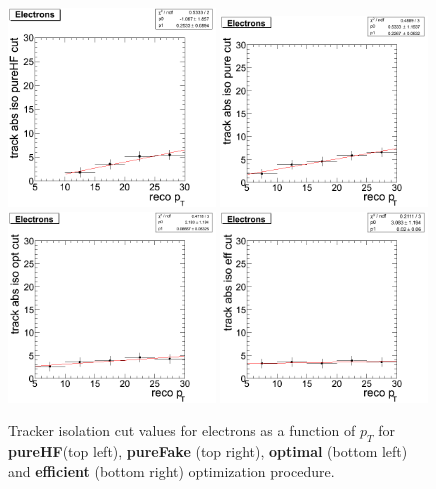 \documentclass{cmspaper}
\begin{document}
\begin{figure}[htbp]
\begin{center}
   \includegraphics[width = 0.49\textwidth]{pictures/optIsoCut/trackIso_elec_pure_HF.png}
   \includegraphics[width = 0.49\textwidth]{pictures/optIsoCut/trackIso_elec_pure.png}
   \includegraphics[width = 0.49\textwidth]{pictures/optIsoCut/trackIso_elec_opt.png}
   \includegraphics[width = 0.49\textwidth]{pictures/optIsoCut/trackIso_elec_eff.png}
    \caption{\small{\label{fig:optTrackIso_elec}Tracker isolation
 cut values for electrons as a function of $p_T$ for {\bf pureHF}(top left), {\bf pureFake} (top right),
	{\bf optimal} (bottom left) and {\bf efficient} (bottom right) optimization procedure. }}
\end{center}
\end{figure}
\end{document}
